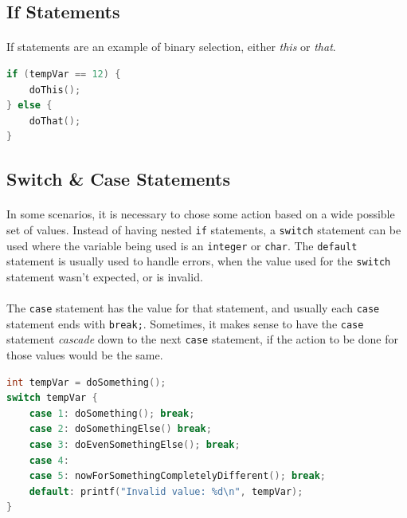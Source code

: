\documentclass[letter,11pt]{article}
\begin{document}
\subsection{If Statements}
\paragraph{}If statements are an example of binary selection, either \textit{this} or \textit{that}.
\begin{lstlisting}[language=C,basicstyle=\footnotesize,keywordstyle=\color{blue},commentstyle=\color{green},showstringspaces=false,stringstyle=\color{red}]
if (tempVar == 12) {
    doThis();
} else {
    doThat();
}
\end{lstlisting}

\subsection{Switch \& Case Statements}\label{sec:switchcase}
\paragraph{}In some scenarios, it is necessary to chose some action based on a wide possible set of values. Instead of having nested \texttt{if} statements, a \texttt{switch} statement can be used where the variable being used is an \texttt{integer} or \texttt{char}. The \texttt{default} statement is usually used to handle errors, when the value used for the \texttt{switch} statement wasn't expected, or is invalid.

\paragraph{}The \texttt{case} statement has the value for that statement, and usually each \texttt{case} statement ends with \texttt{break;}. Sometimes, it makes sense to have the \texttt{case} statement \textit{cascade} down to the next \texttt{case} statement, if the action to be done for those values would be the same.

\begin{lstlisting}[language=C,basicstyle=\footnotesize,keywordstyle=\color{blue},commentstyle=\color{green},showstringspaces=false,stringstyle=\color{red}]
int tempVar = doSomething();
switch tempVar {
    case 1: doSomething(); break;
    case 2: doSomethingElse() break;
    case 3: doEvenSomethingElse(); break;
    case 4:
    case 5: nowForSomethingCompletelyDifferent(); break;
    default: printf("Invalid value: %d\n", tempVar);
}
\end{lstlisting}
\end{document}
